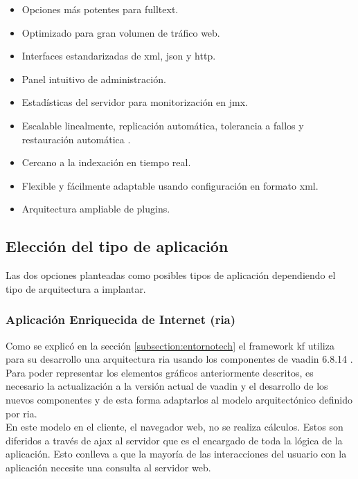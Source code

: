 \begin{itemize}
	\item Opciones más potentes para \gls{fulltext}.
    \item Optimizado para gran volumen de tráfico web.
    \item Interfaces estandarizadas de \gls{xml}, \gls{json} y \gls{http}.
    \item Panel intuitivo de administración.
    \item Estadísticas del servidor para monitorización en \gls{jmx}.
    \item Escalable linealmente, replicación automática, tolerancia a fallos y restauración automática \cite{solroncloud}.
    \item Cercano a la indexación en tiempo real.
    \item Flexible y fácilmente adaptable usando configuración en formato \gls{xml}.
    \item Arquitectura ampliable de \glspl{plugin}.
\end{itemize}

\subsection{Elección del tipo de aplicación}
Las dos opciones planteadas como posibles tipos de aplicación dependiendo el tipo de arquitectura a implantar.

\subsubsection{Aplicación Enriquecida de Internet (\gls{ria})}
Como se explicó en la sección \ref{subsection:entornotech} el \gls{framework} \gls{kf} utiliza para su desarrollo una arquitectura \gls{ria} usando los componentes de \gls{vaadin} 6.8.14 .\\

Para poder representar los elementos gráficos anteriormente descritos, es necesario la actualización a la versión actual de \gls{vaadin} y el desarrollo de los nuevos componentes y de esta forma adaptarlos al modelo arquitectónico definido por \gls{ria}.\\

En este modelo en el cliente, el navegador web, no se realiza cálculos. Estos son diferidos a través de \gls{ajax} al servidor que es el encargado de toda la lógica de la aplicación. Esto conlleva a que la mayoría de las interacciones del usuario con la aplicación necesite una consulta al servidor web.

